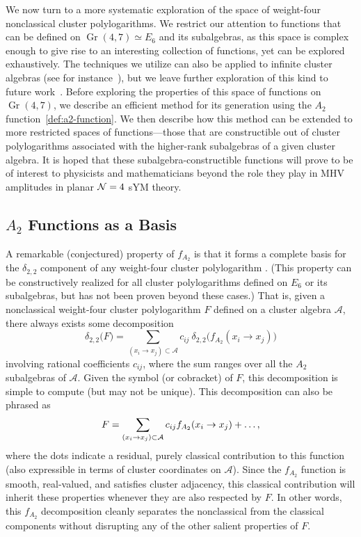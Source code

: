 \documentclass[12pt]{article}
\DeclareMathOperator{\Gr}{Gr}
\def\a{\mathcal{A}}
\def\pdfeq#1{\texorpdfstring{$#1$}{a}}
\begin{document}
We now turn to a more systematic exploration of the space of weight-four nonclassical cluster polylogarithms. We restrict our attention to functions that can be defined on $\Gr(4,7) \simeq E_6$ and its subalgebras, as this space is complex enough to give rise to an interesting collection of functions, yet can be explored exhaustively. The techniques we utilize can also be applied to infinite cluster algebras (see for instance~\cite{Golden:2014xqa}), but we leave further exploration of this kind to future work~\cite{cluster_subalgebras_ii}. Before exploring the properties of this space of functions on $\Gr(4,7)$, we describe an efficient method for its generation using the $A_2$ function~\eqref{def:a2-function}. We then describe how this method can be extended to more restricted spaces of functions---those that are constructible out of cluster polylogarithms associated with the higher-rank subalgebras of a given cluster algebra. It is hoped that these subalgebra-constructible functions will prove to be of interest to physicists and mathematicians beyond the role they play in MHV amplitudes in planar ${\cal N}=4$ sYM theory. 

\subsection{\pdfeq{A_2} Functions as a Basis}

A remarkable (conjectured) property of $f_{A_2}$ is that it forms a complete basis for the $\delta_{2,2}$ component of any weight-four cluster polylogarithm \cite{Golden:2014xqa}. (This property can be constructively realized for all cluster polylogarithms defined on $E_6$ or its subalgebras, but has not been proven beyond these cases.) That is, given a nonclassical weight-four cluster polylogarithm $F$ defined on a cluster algebra $\a$, there always exists some decomposition
\begin{equation}\label{eq:a2-decomp}
	\delta_{2,2} \big(F\big) = \sum_{(x_i\to x_j) \subset \a} c_{ij} ~\delta_{2,2}\big(f_{A_2}(x_i \to x_j) \big) 
\end{equation}
involving rational coefficients $c_{ij}$, where the sum ranges over all the $A_2$ subalgebras of $\a$. Given the symbol (or cobracket) of $F$, this decomposition is simple to compute (but may not be unique). This decomposition can also be phrased as 
\begin{equation}\label{eq:a2-decomp-full}
	F = \sum_{(x_i\to x_j) \subset \a} c_{ij} f_{A_2}(x_i \to x_j) + \dots, \vspace{-.1cm}
\end{equation}
where the dots indicate a residual, purely classical contribution to this function (also expressible in terms of cluster coordinates on $\a$). Since the $f_{A_2}$ function is smooth, real-valued, and satisfies cluster adjacency, this classical contribution will inherit these properties whenever they are also respected by $F$. In other words, this $f_{A_2}$ decomposition cleanly separates the nonclassical from the classical components without disrupting any of the other salient properties of $F$. 
\end{document}
